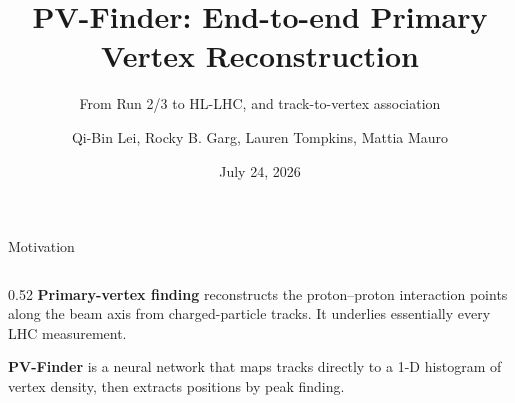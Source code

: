 \documentclass[xcolor=table,aspectratio=169]{beamer}
\title[PV-Finder]{PV-Finder: End-to-end Primary Vertex Reconstruction}
\subtitle{From Run 2/3 to HL-LHC, and track-to-vertex association}
\author[Mattia Mauro]{Qi-Bin Lei, Rocky B. Garg, Lauren Tompkins, \textcolor{pennred}{Mattia Mauro}}
\institute[]{Stanford University}
\date{July 24, 2026}
\def\thisframelogos{}
\newcommand{\framelogo}[1]{\def\thisframelogos{#1}}
\begin{document}
\framelogo{}

\begin{frame}[plain]
    \titlepage
\end{frame}


\begin{frame}[shrink=15]{Motivation}
    \begin{columns}[c]
        \begin{column}{0.52\linewidth}
            \textbf{Primary-vertex finding} reconstructs the proton--proton
            interaction points along the beam axis from charged-particle tracks.
            It underlies essentially every LHC measurement.

            \vspace{0.55em}
            \textbf{PV-Finder} is a neural network that maps tracks directly to a
            1-D histogram of vertex density, then extracts positions by peak finding.


\end{column}
\end{columns}
\end{frame}
\end{document}
